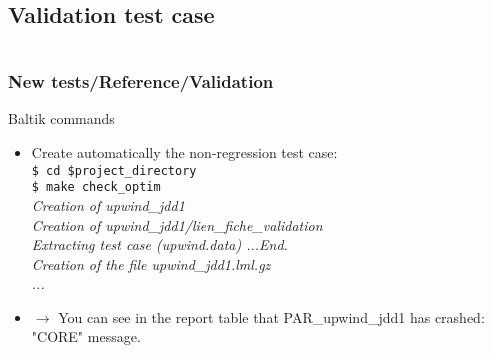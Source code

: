 \documentclass[10pt, hyperref={unicode=true,pdfusetitle, bookmarks=true,bookmarksnumbered=false,bookmarksopen=false, breaklinks=false,pdfborder={0 0 1},backref=true,colorlinks=true,linkcolor=darkblue,pageanchor, urlcolor=darkblue}]{beamer}
\begin{document}
\subsection{{\bf{Validation test case}}}
\begin{frame}
\begin{columns}[c] 
\tableofcontents[sections={1-4},currentsection, currentsubsection]
\tableofcontents[sections={5-10},currentsection, currentsubsection]
\end{columns}
\end{frame}
\begin{frame}
\frametitle{New tests/Reference/Validation}
\begin{block}{Baltik commands}

\begin{itemize}
\item Create automatically the non-regression test case:\\
\texttt{\$ cd \$project\_directory}\\
\texttt{\$ make check\_optim}\\
\textit{\hspace{0.1cm} Creation of upwind\_jdd1}\\
\textit{\hspace{0.1cm} Creation of upwind\_jdd1/lien\_fiche\_validation}\\
\textit{\hspace{0.1cm} Extracting test case (upwind.data) ...End.}\\
\textit{\hspace{0.1cm} Creation of the file upwind\_jdd1.lml.gz}\\
\textit{\hspace{0.1cm} ...}\\
\item $\rightarrow$ You can see in the report table that PAR\_upwind\_jdd1 has crashed: "CORE" message.\\
\end{itemize}

\end{block}
\end{frame}
\end{document}
